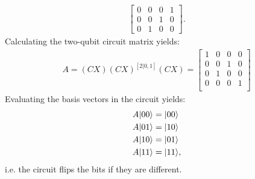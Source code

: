 \documentclass[11pt,a4paper]{article}
\begin{document}
\begin{enumerate}
\begin{enumerate}
\begin{align*}
\begin{bmatrix}
                                            0 & 0 & 0 & 1 \\
                                            0 & 0 & 1 & 0 \\
                                            0 & 1 & 0 & 0
                                        \end{bmatrix}.
                    \end{align*}
                    Calculating the two-qubit circuit matrix yields:
                    \begin{align*}
                        A = (CX)(CX)^{[2|0, 1]}(CX) = \begin{bmatrix}
                                                          1 & 0 & 0 & 0 \\
                                                          0 & 0 & 1 & 0 \\
                                                          0 & 1 & 0 & 0 \\
                                                          0 & 0 & 0 & 1 \\
                                                      \end{bmatrix}
                    \end{align*}
                    Evaluating the basis vectors in the circuit yields:
                    \begin{align*}
                        A|00\rangle & = |00\rangle  \\
                        A|01\rangle & = |10\rangle  \\
                        A|10\rangle & = |01\rangle  \\
                        A|11\rangle & = |11\rangle,
                    \end{align*}
                    i.e. the circuit flips the bits if they are different.

                    \newpage


\end{enumerate}
\end{enumerate}
\end{document}
